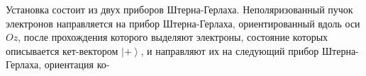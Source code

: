 \documentclass[__main__.tex]{subfiles}
\begin{document}
Установка состоит из двух приборов Штерна-Герлаха. Неполяризованный пучок электронов направляется на прибор Штерна-Герлаха, ориентированный вдоль оси $Oz$, после прохождения которого выделяют электроны, состояние которых описывается кет-вектором $\left|+\right>$, и направляют их на следующий прибор Штерна-Герлаха, ориентация ко-\\ 

\end{document}
